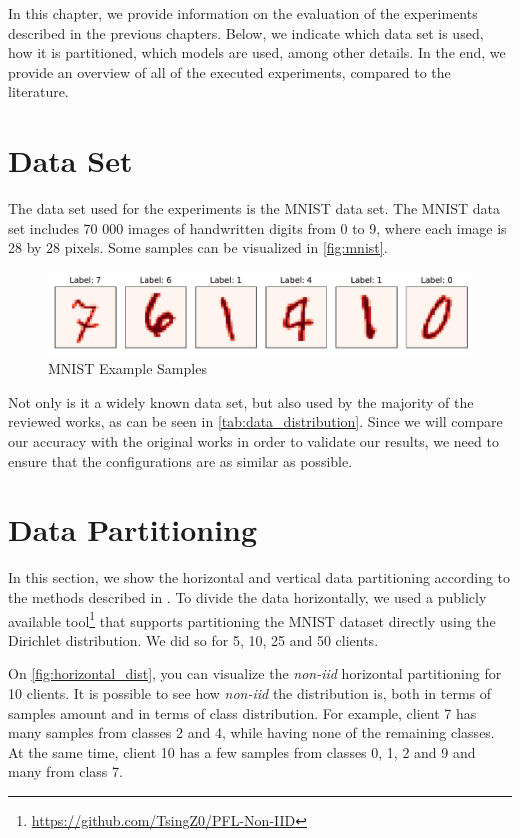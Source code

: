 In this chapter, we provide information on the evaluation of the experiments described in the previous chapters. Below, we indicate which data set is used, how it is partitioned, which models are used, among other details. In the end, we provide an overview of all of the executed experiments, compared to the literature.

\section{Data Set}

The data set used for the experiments is the MNIST\cite{lecun2010mnist} data set. The MNIST data set includes 70 000 images of handwritten digits from 0 to 9, where each image is 28 by 28 pixels. Some samples can be visualized in \autoref{fig:mnist}.

\begin{figure}[!htp]
    \centering
    \centering
    \includegraphics[width=1\textwidth]{graphics/mnist.pdf}
    \caption{MNIST Example Samples}
    \label{fig:mnist}
\end{figure}

Not only is it a widely known data set, but also used by the majority of the reviewed works, as can be seen in \autoref{tab:data_distribution}. Since we will compare our accuracy with the original works in order to validate our results, we need to ensure that the configurations are as similar as possible.

\section{Data Partitioning}

In this section, we show the horizontal and vertical data partitioning according to the methods described in . To divide the data horizontally, we used a publicly available tool\footnote{\url{https://github.com/TsingZ0/PFL-Non-IID}} that supports partitioning the MNIST dataset directly using the Dirichlet distribution. We did so for 5, 10, 25 and 50 clients.

On \autoref{fig:horizontal_dist}, you can visualize the \textit{non-iid} horizontal partitioning for 10 clients. It is possible to see how \textit{non-iid} the distribution is, both in terms of samples amount and in terms of class distribution. For example, client 7 has many samples from classes 2 and 4, while having none of the remaining classes. At the same time, client 10 has a few samples from classes 0, 1, 2 and 9 and many from class 7.

